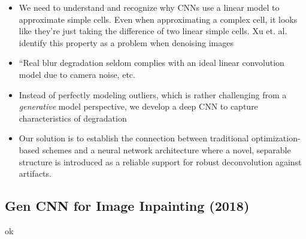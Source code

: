 \documentclass[12pt]{article}
\begin{document}
\begin{itemize}
\item We need to understand and recognize why CNNs use a linear
  model to approximate simple cells. Even when approximating a complex
  cell, it looks like they're just taking the difference of two linear
  simple cells. Xu et. al. \cite{xu2014deep} identify this property as
  a problem when denoising images
\item ``Real blur degradation seldom complies with an ideal linear
  convolution model due to camera noise, etc.\cite{xu2014deep}
\item Instead of perfectly modeling outliers, which is rather
  challenging from a \textit{generative} model perspective, we develop
  a deep CNN to capture characteristics of degradation
\item Our solution is to establish the connection between
  traditional optimization-based schemes and a neural network architecture
  where a novel, separable structure is introduced as a reliable support for
  robust deconvolution against artifacts.
\end{itemize}


\subsection{Gen CNN for Image Inpainting \cite{wang2018image} (2018)}

ok






\end{document}
